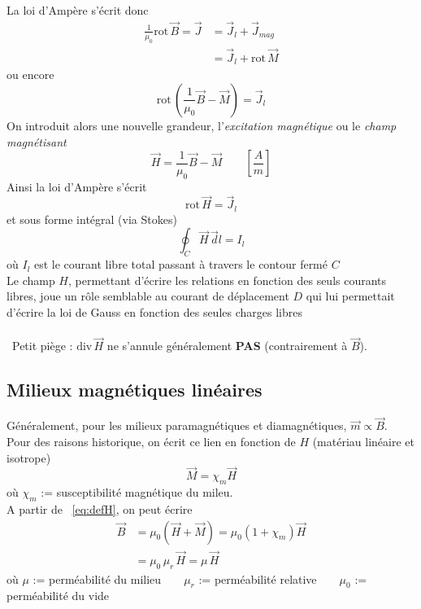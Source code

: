 \documentclass	[11pt, a4paper, openany]{book}
\newcommand{\rot}{\text{rot}\,}
\newcommand{\divv}{\text{div}\,}
\newcommand{\danger}{{\huge\fontencoding{U}\fontfamily{futs}\selectfont\char 66\relax}\ }
\begin{document}
	La loi d'Ampère s'écrit donc 
	\begin{align}
		\frac{1}{\mu_0}\rot\vec B=\vec J & =\vec J_{l}+\vec J_{mag} \\
		                                 & =\vec J_{l}+\rot\vec M   
	\end{align}
	ou encore 
	\begin{equation}
		\rot\left(\frac{1}{\mu_0}\vec B-\vec M\right)=\vec J_{l}
	\end{equation}
	On introduit alors une nouvelle grandeur, l'\textit{excitation magnétique} ou le \textit{champ magnétisant}
	\begin{equation}\label{eq:defH}
		\vec H=\frac{1}{\mu_0}\vec B-\vec M\qquad \left[\frac{A}{m}\right]
	\end{equation}
	Ainsi la loi d'Ampère s'écrit
	\begin{equation}
		\rot\vec H=\vec J_{l}
	\end{equation}
	et sous forme intégral (via Stokes)
	\begin{equation}\label{eq:ampereH}
		\oint_C\vec H\,\vec dl=I_{l}
	\end{equation}
	où $I_{l}$ est le courant libre total passant à travers le contour fermé $C$\\
	
	Le champ $H$, permettant d'écrire les relations en fonction des seuls courants libres, joue un rôle semblable au courant de déplacement $D$ qui lui permettait d'écrire la loi de Gauss en fonction des seules charges libres\\\\
	\danger Petit piège :  $\divv \vec{H}$ ne s'annule généralement \textbf{PAS} (contrairement à $\vec{B}$).
	\subsection{Milieux magnétiques linéaires}
	Généralement, pour les milieux paramagnétiques et diamagnétiques,  $\vec m \propto\vec B$.\ \\
	Pour des raisons historique, on écrit ce lien en fonction de $H$ (matériau linéaire et isotrope)
	\begin{equation}
		\vec M=\chi_m\vec H
	\end{equation}
	où $\chi_m$ := susceptibilité magnétique du mileu.\\
	
	A partir de ~\eqref{eq:defH}, on peut écrire
	\begin{align}
		\vec B & =\mu_0\left(\vec H+\vec M\right)=\mu_0(1+\chi_m)\vec H \\
		       & =\mu_0\,\mu_r\,\vec H=\mu\,\vec H                      
	\end{align}
	où $\mu$ := perméabilité du milieu$\qquad\mu_r$ := perméabilité relative$\qquad\mu_0$ := perméabilité du vide\\
	
\end{document}
